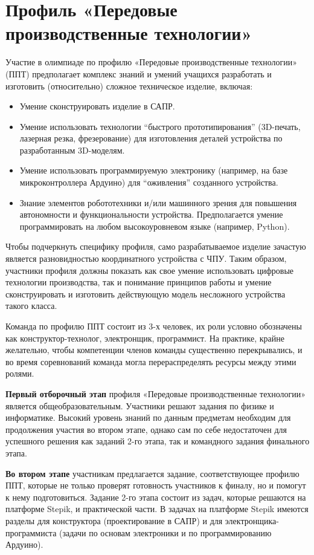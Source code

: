 

\chapter{Профиль «Передовые производственные технологии»}

Участие в олимпиаде по профилю «Передовые производственные технологии» (ППТ) предполагает комплекс знаний и умений учащихся разработать и изготовить (относительно) сложное техническое изделие, включая:
\begin{itemize}
    \item Умение сконструировать изделие в САПР.
    \item Умение использовать технологии “быстрого прототипирования” (3D-печать, лазерная резка, фрезерование) для изготовления деталей устройства по разработанным 3D-моделям. 
    \item Умение использовать программируемую электронику (например, на базе микроконтроллера Ардуино) для “оживления” созданного устройства.
    \item Знание элементов робототехники и/или машинного зрения для повышения автономности и функциональности устройства.  Предполагается умение программировать на любом высокоуровневом языке (например, Python).
\end{itemize}

Чтобы подчеркнуть специфику профиля, само разрабатываемое изделие зачастую является разновидностью координатного устройства с ЧПУ.  Таким образом, участники профиля должны показать как свое умение использовать цифровые технологии производства, так и понимание принципов работы и умение сконструировать и изготовить действующую модель несложного устройства такого класса.

Команда по профилю ППТ состоит из 3-х человек, их роли условно обозначены как конструктор-технолог, электронщик, программист.  На практике, крайне желательно, чтобы компетенции членов команды существенно перекрывались, и во время соревнований команда могла перераспределять ресурсы между этими ролями.

\textbf{Первый отборочный этап} профиля «Передовые производственные технологии» является общеобразовательным. Участники решают задания по физике и информатике. Высокий уровень знаний по данным предметам необходим для продолжения участия во втором этапе, однако сам по себе недостаточен для успешного решения как заданий 2-го этапа, так и командного задания финального этапа. 

\textbf{Во втором этапе} участникам предлагается задание, соответствующее профилю ППТ, которые не только проверят готовность участников к финалу, но и помогут к нему подготовиться. Задание 2-го этапа состоит из задач, которые решаются на платформе Stepik, и практической части. В задачах на платформе Stepik имеются разделы для конструктора (проектирование в САПР) и для электронщика-программиста (задачи по основам электроники и по программированию Ардуино). 

